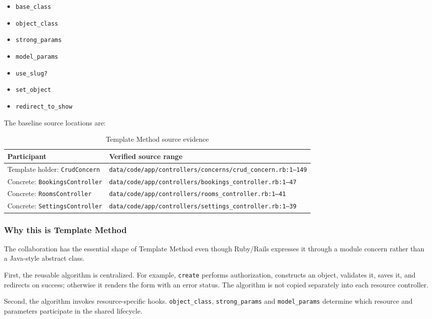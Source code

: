 \documentclass[10pt,a4paper]{article}
\newcommand{\code}[1]{\texttt{\small #1}}
\begin{document}
\begin{itemize}[leftmargin=*]
\item \code{base\_class}
\item \code{object\_class}
\item \code{strong\_params}
\item \code{model\_params}
\item \code{use\_slug?}
\item \code{set\_object}
\item \code{redirect\_to\_show}
\end{itemize}

The baseline source locations are:

\begin{table}[H]
\centering
\caption{Template Method source evidence}
\label{tab:tm-evidence}
\begin{tabularx}{\linewidth}{lX}
\toprule
Participant & Verified source range\\
\midrule
Template holder: \code{CrudConcern} & \code{data/code/app/controllers/concerns/crud\_concern.rb:1--149}\\
Concrete: \code{BookingsController} & \code{data/code/app/controllers/bookings\_controller.rb:1--47}\\
Concrete: \code{RoomsController} & \code{data/code/app/controllers/rooms\_controller.rb:1--41}\\
Concrete: \code{SettingsController} & \code{data/code/app/controllers/settings\_controller.rb:1--39}\\
\bottomrule
\end{tabularx}
\end{table}

\subsubsection{Why this is Template Method}

The collaboration has the essential shape of Template Method even though Ruby/Rails expresses it through a module concern rather than a Java-style abstract class.

First, the reusable algorithm is centralized. For example, \code{create} performs authorization, constructs an object, validates it, saves it, and redirects on success; otherwise it renders the form with an error status. The algorithm is not copied separately into each resource controller.

Second, the algorithm invokes resource-specific hooks. \code{object\_class}, \code{strong\_params} and \code{model\_params} determine which resource and parameters participate in the shared lifecycle.
\end{document}
